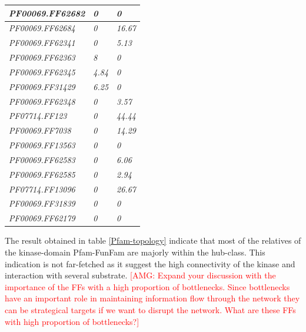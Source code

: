 \documentclass[a4paper, 11pt]{article}
\newcommand{\redcomment}[1]{\textcolor{red}{[#1]}} %
\begin{document}
\begin{table}[H]
\begin{tabular}{|l|l|l|}
\textit{PF00069.FF62682} & \textit{0}                & \textit{0}         \\ \hline
\textit{PF00069.FF62684} & \textit{0}                & \textit{16.67}     \\ \hline
\textit{PF00069.FF62341} & \textit{0}                & \textit{5.13}      \\ \hline
\textit{PF00069.FF62363} & \textit{8}                & \textit{0}         \\ \hline
\textit{PF00069.FF62345} & \textit{4.84}             & \textit{0}         \\ \hline
\textit{PF00069.FF31429} & \textit{6.25}             & \textit{0}         \\ \hline
\textit{PF00069.FF62348} & \textit{0}                & \textit{3.57}      \\ \hline
\textit{PF07714.FF123}   & \textit{0}                & \textit{44.44}     \\ \hline
\textit{PF00069.FF7038}  & \textit{0}                & \textit{14.29}     \\ \hline
\textit{PF00069.FF13563} & \textit{0}                & \textit{0}         \\ \hline
\textit{PF00069.FF62583} & \textit{0}                & \textit{6.06}      \\ \hline
\textit{PF00069.FF62585} & \textit{0}                & \textit{2.94}      \\ \hline
\textit{PF07714.FF13096} & \textit{0}                & \textit{26.67}     \\ \hline
\textit{PF00069.FF31839} & \textit{0}                & \textit{0}         \\ \hline
\textit{PF00069.FF62179} & \textit{0}                & \textit{0}         \\ \hline
\end{tabular}
\end{table}

The result obtained in table \ref{Pfam-topology} indicate that most of the relatives of the kinase-domain Pfam-FunFam are majorly within the hub-class. This indication is not far-fetched as it suggest the high connectivity of the kinase and interaction with several substrate. \redcomment{AMG: Expand your discussion with the importance of the FFs with a high proportion of bottlenecks. Since bottlenecks have an important role in maintaining information flow through the network they can be strategical targets if we want to disrupt the network. What are these FFs with high proportion of bottlenecks?}
\end{document}
